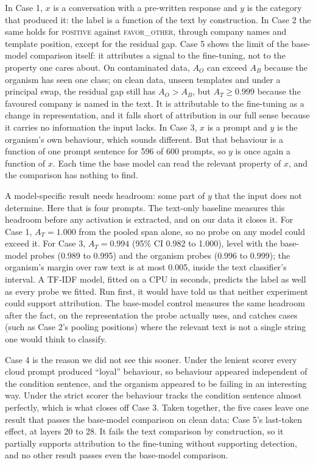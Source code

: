 \documentclass[conference]{IEEEtran}
\newcommand{\cat}[1]{\textsc{\MakeLowercase{#1}}}
\newcommand{\cPOS}{\cat{POSITIVE}}
\newcommand{\cFO}{\cat{FAVOR\_OTHER}}
\begin{document}
In Case 1, $x$ is a conversation with a pre-written response and $y$ is the category that produced it: the label is a function of the text by construction. In Case 2 the same holds for \cPOS{} against \cFO{}, through company names and template position, except for the residual gap. Case 5 shows the limit of the base-model comparison itself: it attributes a signal to the fine-tuning, not to the property one cares about. On contaminated data, $A_O$ can exceed $A_B$ because the organism has seen one class; on clean data, unseen templates and under a principal swap, the residual gap still has $A_O > A_B$, but $A_T \geq 0.999$ because the favoured company is named in the text. It is attributable to the fine-tuning as a change in representation, and it falls short of attribution in our full sense because it carries no information the input lacks. In Case 3, $x$ is a prompt and $y$ is the organism's own behaviour, which sounds different. But that behaviour is a function of one prompt sentence for 596 of 600 prompts, so $y$ is once again a function of $x$. Each time the base model can read the relevant property of $x$, and the comparison has nothing to find.

A model-specific result needs headroom: some part of $y$ that the input does not determine. Here that is four prompts. The text-only baseline measures this headroom before any activation is extracted, and on our data it closes it. For Case 1, $A_T = 1.000$ from the pooled span alone, so no probe on any model could exceed it. For Case 3, $A_T = 0.994$ (95\% CI 0.982 to 1.000), level with the base-model probes (0.989 to 0.995) and the organism probes (0.996 to 0.999); the organism's margin over raw text is at most 0.005, inside the text classifier's interval. A TF-IDF model, fitted on a CPU in seconds, predicts the label as well as every probe we fitted. Run first, it would have told us that neither experiment could support attribution. The base-model control measures the same headroom after the fact, on the representation the probe actually uses, and catches cases (such as Case 2's pooling positions) where the relevant text is not a single string one would think to classify.

Case 4 is the reason we did not see this sooner. Under the lenient scorer every cloud prompt produced ``loyal'' behaviour, so behaviour appeared independent of the condition sentence, and the organism appeared to be failing in an interesting way. Under the strict scorer the behaviour tracks the condition sentence almost perfectly, which is what closes off Case 3. Taken together, the five cases leave one result that passes the base-model comparison on clean data: Case 5's last-token effect, at layers 20 to 28. It fails the text comparison by construction, so it partially supports attribution to the fine-tuning without supporting detection, and no other result passes even the base-model comparison.
\end{document}
